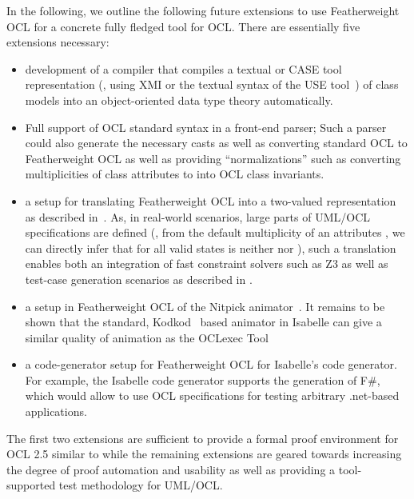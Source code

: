 In the following, we outline the following future extensions to use
Featherweight OCL for a concrete fully fledged tool for OCL.  There are
essentially five extensions necessary:
\begin{itemize}
\item development of a compiler that compiles a textual or CASE
  tool representation (\eg, using XMI or the textual syntax of
  the USE tool~\cite{richters:precise:2002}) of class
  models into an object-oriented data type theory automatically.
\item Full support of OCL standard syntax in a front-end parser;
  Such a parser could also generate the necessary casts as well as
  converting standard OCL to Featherweight OCL as well as providing
  ``normalizations'' such as converting multiplicities of class
  attributes to into OCL class invariants.
\item a setup for translating Featherweight OCL into a two-valued
  representation as described
  in~\cite{brucker.ea:ocl-testing:2010}. As, in real-world scenarios,
  large parts of {UML}/{OCL} specifications are defined (\eg,
  from the default multiplicity  of an attributes
  , we can directly infer that for all valid states
   is neither  nor ),
  such a translation enables both an integration of fast constraint solvers
  such as Z3 as well as test-case generation scenarios as described in 
  \cite{brucker.ea:ocl-testing:2010}.
\item a setup in Featherweight OCL of the Nitpick
  animator~\cite{blanchette.ea:nitpick:2010}. It remains to be shown
  that the standard, Kodkod~\cite{torlak.ea:kodkod:2007} based
  animator in Isabelle can give a similar quality of animation as the
  OCLexec Tool~\cite{krieger.ea:generative:2010}
\item a code-generator setup for Featherweight OCL for Isabelle's
  code generator. For example, the Isabelle code generator supports
  the generation of F\#, which would allow to use {OCL}
  specifications for testing arbitrary .net-based applications.
\end{itemize}
The first two extensions are sufficient to provide a formal proof
environment for OCL 2.5 similar to \holocl while the remaining
extensions are geared towards increasing the degree of proof
automation and usability as well as providing a tool-supported test
methodology for {UML}/{OCL}.


